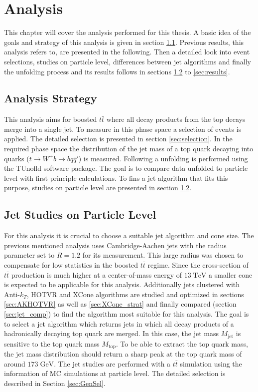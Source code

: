 \chapter{Analysis}
\label{ch:Ana}
	This chapter will cover the analysis performed for this thesis. A basic idea of the goals and strategy of this analysis is given in section \ref{sec:strategy}. Previous results, this analysis refers to, are presented in the following. Then a detailed look into event selections, studies on particle level, differences between jet algorithms and finally the unfolding process and its results follows in sections \ref{sec:jet_studies} to \ref{sec:results}.
\section{Analysis Strategy}
\label{sec:strategy}
	This analysis aims for boosted $t\bar{t}$ where all decay products from the top decays merge into a single jet. To measure in this phase space a selection of events is applied. The detailed selection is presented in section \ref{sec:selection}. In the required phase space the distribution of the jet mass of a top quark decaying into quarks ($t\rightarrow W^{+} b \rightarrow b q \bar{q}'$) is measured. Following a unfolding is performed using the TUnofld \cite{tunfold} software package. The goal is to compare data unfolded to particle level with first principle calculations. To fins a jet algorithm that fits this purpose, studies on particle level are presented in section \ref{sec:jet_studies}.
	

\section{Jet Studies on Particle Level}
\label{sec:jet_studies}
	For this analysis it is crucial to choose a suitable jet algorithm and cone size. The previous mentioned analysis \cite{torben_paper} uses Cambridge-Aachen jets with the radius parameter set to $R=1.2$ for its measurement. This large radius was chosen to compensate for low statistics in the boosted $t\bar{t}$ regime. Since the cross-section of $t\bar{t}$ production is much higher at a center-of-mass energy of $13\;\text{TeV}$ a smaller cone is expected to be applicable for this analysis. Additionally jets clustered with Anti-$k_T$, HOTVR and XCone algorithms are studied and optimized in sections \ref{sec:AKHOTVR} as well as \ref{sec:XCone_strat} and finally compared (section \ref{sec:jet_comp}) to find the algorithm most suitable for this analysis. The goal is to select a jet algorithm which returns jets in which all decay products of a hadronically decaying top quark are merged. In this case, the jet mass $M_\text{jet}$ is sensitive to the top quark mass $M_\text{top}$. To be able to extract the top quark mass, the jet mass distribution should return a sharp peak at the top quark mass of around $173\;\text{GeV}$. The jet studies are performed with a $t\bar{t}$ simulation using the information of MC simulations at particle level. The detailed selection is described in Section \ref{sec:GenSel}.

